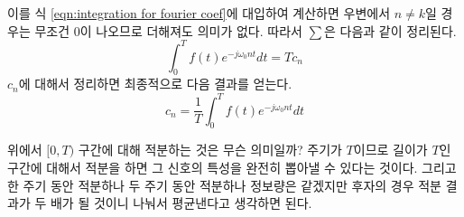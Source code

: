 이를 식 \ref{eqn:integration for fourier coef}에 대입하여 계산하면 우변에서 $n\neq k$일 경우는 무조건 $0$이 나오므로 더해져도 의미가 없다. 따라서 $\sum$은 다음과 같이 정리된다.
\begin{equation*}
    \int_{0}^{T} f(t)e^{-j\omega_0nt}dt=Tc_n
\end{equation*}
$c_n$에 대해서 정리하면 최종적으로 다음 결과를 얻는다.
\begin{equation}
    c_n=\frac{1}{T}\int_{0}^{T} f(t)e^{-j\omega_0nt}dt\label{eqn:int interval of ctfs}
\end{equation}
\par
위에서 $[0,T)$ 구간에 대해 적분하는 것은 무슨 의미일까? 주기가 $T$이므로 길이가 $T$인 구간에 대해서 적분을 하면 그 신호의 특성을 완전히 뽑아낼 수 있다는 것이다.
그리고 한 주기 동안 적분하나 두 주기 동안 적분하나 정보량은 같겠지만 후자의 경우 적분 결과가 두 배가 될 것이니  나눠서 평균낸다고 생각하면 된다.

